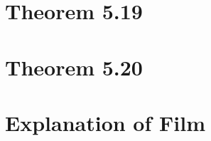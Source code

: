 \documentclass{amsart}
\theoremstyle{definition}
\theoremstyle{remark}
\numberwithin{equation}{section}
\begin{document}
\section{Theorem 5.19}

\section{Theorem 5.20}





\section{Explanation of Film}


 
\end{document}
